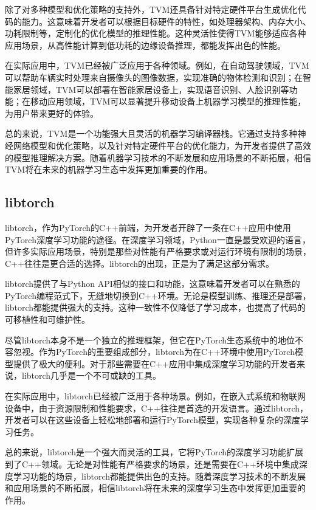 除了对多种模型和优化策略的支持外，TVM还具备针对特定硬件平台生成优化代码的能力。这意味着开发者可以根据目标硬件的特性，如处理器架构、内存大小、功耗限制等，定制化的优化模型的推理性能。这种灵活性使得TVM能够适应各种应用场景，从高性能计算到低功耗的边缘设备推理，都能发挥出色的性能。

在实际应用中，TVM已经被广泛应用于各种领域。例如，在自动驾驶领域，TVM可以帮助车辆实时处理来自摄像头的图像数据，实现准确的物体检测和识别；在智能家居领域，TVM可以部署在智能家居设备上，实现语音识别、人脸识别等功能；在移动应用领域，TVM可以显著提升移动设备上机器学习模型的推理性能，为用户带来更好的体验。

总的来说，TVM是一个功能强大且灵活的机器学习编译器栈。它通过支持多种神经网络模型和优化策略，以及针对特定硬件平台的优化能力，为开发者提供了高效的模型推理解决方案。随着机器学习技术的不断发展和应用场景的不断拓展，相信TVM将在未来的机器学习生态中发挥更加重要的作用。

\subsection{libtorch}

libtorch，作为PyTorch的C++前端，为开发者开辟了一条在C++应用中使用PyTorch深度学习功能的途径。在深度学习领域，Python一直是最受欢迎的语言，但许多实际应用场景，特别是那些对性能有严格要求或对运行环境有限制的场景，C++往往是更合适的选择。libtorch的出现，正是为了满足这部分需求。

libtorch提供了与Python API相似的接口和功能，这意味着开发者可以在熟悉的PyTorch编程范式下，无缝地切换到C++环境。无论是模型训练、推理还是部署，libtorch都能提供强大的支持。这种一致性不仅降低了学习成本，也提高了代码的可移植性和可维护性。

尽管libtorch本身不是一个独立的推理框架，但它在PyTorch生态系统中的地位不容忽视。作为PyTorch的重要组成部分，libtorch为在C++环境中使用PyTorch模型提供了极大的便利。对于那些需要在C++应用中集成深度学习功能的开发者来说，libtorch几乎是一个不可或缺的工具。

在实际应用中，libtorch已经被广泛用于各种场景。例如，在嵌入式系统和物联网设备中，由于资源限制和性能要求，C++往往是首选的开发语言。通过libtorch，开发者可以在这些设备上轻松地部署和运行PyTorch模型，实现各种复杂的深度学习任务。

总的来说，libtorch是一个强大而灵活的工具，它将PyTorch的深度学习功能扩展到了C++领域。无论是对性能有严格要求的场景，还是需要在C++环境中集成深度学习功能的场景，libtorch都能提供出色的支持。随着深度学习技术的不断发展和应用场景的不断拓展，相信libtorch将在未来的深度学习生态中发挥更加重要的作用。

